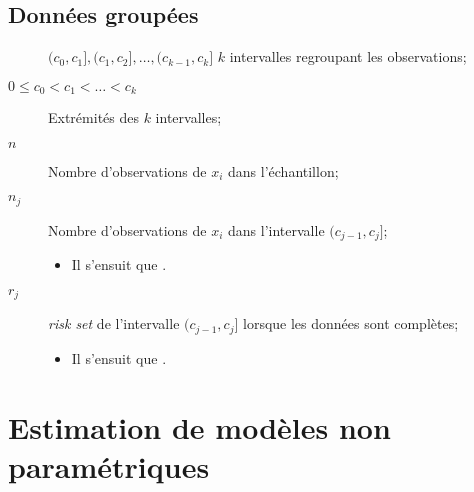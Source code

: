 \documentclass[10pt, french]{article}
\begin{document}
\begin{multicols*}{2}
\columnbreak
\subsection{Données groupées}
\begin{distributions}[Notation]
\begin{description}
	\item[]	$(c_{0}, c_{1}], (c_{1}, c_{2}], \dots, (c_{k - 1}, c_{k}]$	$k$ intervalles regroupant les observations;
	\item[$0	\leq	c_{0}	<	c_{1}	<	\hdots	<	c_{k}$]	Extrémités des $k$ intervalles;
	\item[$n$]	Nombre d'observations de $x_{i}$ dans l'échantillon;
	\item[$n_{j}$]	Nombre d'observations de $x_{i}$ dans l'intervalle $(c_{j - 1}, c_{j}]$;
		\begin{itemize}[leftmargin = *]
		\item	Il s'ensuit que .
		\end{itemize}
	\item[$r_{j}$]	\og \textit{risk set} \fg{} de l'intervalle $(c_{j - 1}, c_{j}]$ lorsque les données sont complètes;
		\begin{itemize}[leftmargin = *]
		\item	Il s'ensuit que .
		\end{itemize}
\end{description}
\end{distributions}

\columnbreak
\section{Estimation de modèles non paramétriques}

\end{multicols*}
\end{document}
